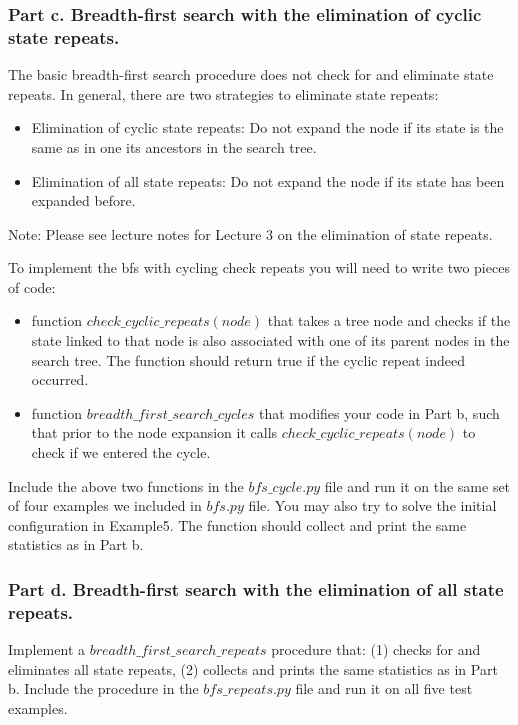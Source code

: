 \documentclass[11pt]{article}
\begin{document}
\subsubsection*{Part c. Breadth-first search with the elimination of cyclic state repeats.} 

The basic breadth-first search procedure 
does not check for and eliminate state repeats. In general, there are two strategies to eliminate state repeats:
\begin{itemize}
\item Elimination of cyclic state repeats: Do not expand the node if its state is the same as in one its ancestors in the search tree.
\item Elimination of all state repeats: Do not expand the node if its state has
been expanded before.
\end{itemize}
Note: Please see lecture notes for Lecture 3 on the elimination of state repeats. 

To implement the bfs with cycling check repeats you will need to write two pieces of code:
\begin{itemize}
\item function $check\_cyclic\_repeats(node)$ that takes a tree node and checks if the state linked to that node is also associated with one of its parent nodes in the search tree. The function should return true if the cyclic repeat indeed occurred. 
\item function $breadth\_first\_search\_cycles$ that modifies your code in Part b, such that prior to the node expansion it calls $check\_cyclic\_repeats(node)$ to check if we entered the cycle.   
\end{itemize}
Include the above two functions in the $bfs\_cycle.py$ file and run it on the same set of four examples we included in $bfs.py$ file. You may also try to solve the initial configuration in Example5. The function should collect and print the same statistics as in Part b.

\subsubsection*{Part d. Breadth-first search with the elimination of all state repeats.} 

Implement a $breadth\_first\_search\_repeats$ procedure that: (1) checks for and eliminates all state repeats, (2) collects and prints the same statistics as in Part b. 
Include the procedure in the $bfs\_repeats.py$ file and run it on all five test examples.  
\end{document}
